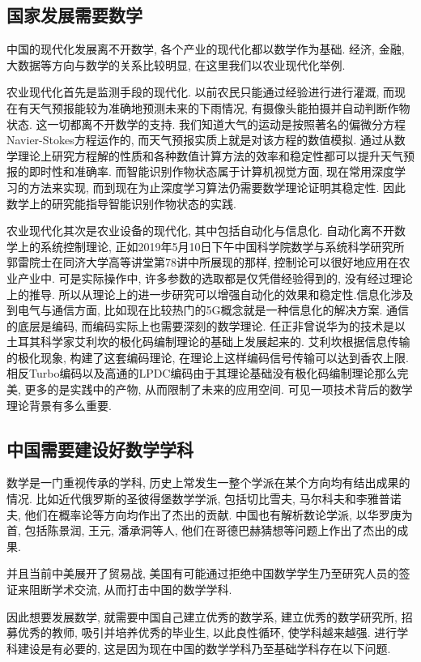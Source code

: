 \subsection{国家发展需要数学}

中国的现代化发展离不开数学, 各个产业的现代化都以数学作为基础. 经济, 金融, 大数据等方向与数学的关系比较明显, 在这里我们以农业现代化举例.

农业现代化首先是监测手段的现代化. 以前农民只能通过经验进行进行灌溉, 而现在有天气预报能较为准确地预测未来的下雨情况, 有摄像头能拍摄并自动判断作物状态. 这一切都离不开数学的支持. 我们知道大气的运动是按照著名的偏微分方程Navier-Stokes方程运作的, 而天气预报实质上就是对该方程的数值模拟. 通过从数学理论上研究方程解的性质和各种数值计算方法的效率和稳定性都可以提升天气预报的即时性和准确率. 而智能识别作物状态属于计算机视觉方面, 现在常用深度学习的方法来实现, 而到现在为止深度学习算法仍需要数学理论证明其稳定性. 因此数学上的研究能指导智能识别作物状态的实践.

农业现代化其次是农业设备的现代化, 其中包括自动化与信息化. 自动化离不开数学上的系统控制理论, 正如2019年5月10日下午中国科学院数学与系统科学研究所郭雷院士在同济大学高等讲堂第78讲中所展现的那样, 控制论可以很好地应用在农业产业中. 可是实际操作中, 许多参数的选取都是仅凭借经验得到的, 没有经过理论上的推导. 所以从理论上的进一步研究可以增强自动化的效果和稳定性.信息化涉及到电气与通信方面, 比如现在比较热门的5G概念就是一种信息化的解决方案. 通信的底层是编码, 而编码实际上也需要深刻的数学理论. 任正非曾说华为的技术是以土耳其科学家艾利坎的极化码编制理论的基础上发展起来的. 艾利坎根据信息传输的极化现象, 构建了这套编码理论, 在理论上这样编码信号传输可以达到香农上限. 相反Turbo编码以及高通的LPDC编码由于其理论基础没有极化码编制理论那么完美, 更多的是实践中的产物, 从而限制了未来的应用空间. 可见一项技术背后的数学理论背景有多么重要.

\subsection{中国需要建设好数学学科}

数学是一门重视传承的学科, 历史上常发生一整个学派在某个方向均有结出成果的情况. 比如近代俄罗斯的圣彼得堡数学学派, 包括切比雪夫, 马尔科夫和李雅普诺夫, 他们在概率论等方向均作出了杰出的贡献. 中国也有解析数论学派, 以华罗庚为首, 包括陈景润, 王元, 潘承洞等人, 他们在哥德巴赫猜想等问题上作出了杰出的成果.

并且当前中美展开了贸易战, 美国有可能通过拒绝中国数学学生乃至研究人员的签证来阻断学术交流, 从而打击中国的数学学科.

因此想要发展数学, 就需要中国自己建立优秀的数学系, 建立优秀的数学研究所, 招募优秀的教师, 吸引并培养优秀的毕业生, 以此良性循环, 使学科越来越强. 进行学科建设是有必要的, 这是因为现在中国的数学学科乃至基础学科存在以下问题.

